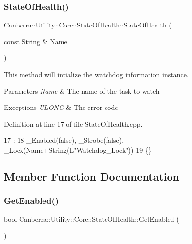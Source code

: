 \subsubsection{\texorpdfstring{State\+Of\+Health()}{StateOfHealth()}}
{\footnotesize\ttfamily Canberra\+::\+Utility\+::\+Core\+::\+State\+Of\+Health\+::\+State\+Of\+Health (\begin{DoxyParamCaption}\item[{const \hyperlink{class_canberra_1_1_utility_1_1_core_1_1_string}{String} \&}]{Name }\end{DoxyParamCaption})}



This method will intialize the watchdog information instance. 


\begin{DoxyParams}{Parameters}
{\em Name} & The name of the task to watch\\
\hline
\end{DoxyParams}

\begin{DoxyExceptions}{Exceptions}
{\em U\+L\+O\+NG} & The error code\\
\hline
\end{DoxyExceptions}


Definition at line 17 of file State\+Of\+Health.\+cpp.


\begin{DoxyCode}
17                                                                   :
18         \_Enabled(\textcolor{keyword}{false}), \_Strobe(\textcolor{keyword}{false}), \_Lock(Name+String(L\textcolor{stringliteral}{"Watchdog\_Lock"}))
19 \{\}
\end{DoxyCode}


\subsection{Member Function Documentation}
\mbox{\label{class_canberra_1_1_utility_1_1_core_1_1_state_of_health_a3031980a79f1f22480dfc18071dac093_a3031980a79f1f22480dfc18071dac093}} 
\subsubsection{\texorpdfstring{Get\+Enabled()}{GetEnabled()}}
{\footnotesize\ttfamily bool Canberra\+::\+Utility\+::\+Core\+::\+State\+Of\+Health\+::\+Get\+Enabled (\begin{DoxyParamCaption}{ }\end{DoxyParamCaption})}



